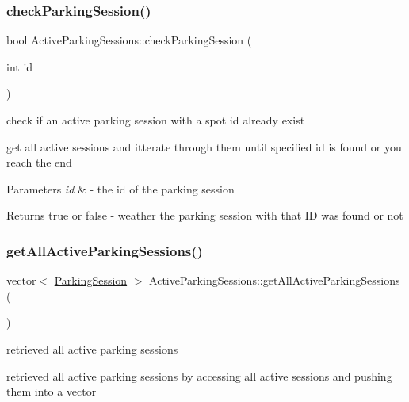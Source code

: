 \subsubsection{\texorpdfstring{check\+Parking\+Session()}{checkParkingSession()}}
{\footnotesize\ttfamily bool Active\+Parking\+Sessions\+::check\+Parking\+Session (\begin{DoxyParamCaption}\item[{int}]{id }\end{DoxyParamCaption})\hspace{0.3cm}{\ttfamily [private]}}



check if an active parking session with a spot id already exist 

get all active sessions and itterate through them until specified id is found or you reach the end


\begin{DoxyParams}{Parameters}
{\em id} & -\/ the id of the parking session \\
\hline
\end{DoxyParams}
\begin{DoxyReturn}{Returns}
true or false -\/ weather the parking session with that ID was found or not 
\end{DoxyReturn}
\mbox{\label{class_active_parking_sessions_a70eefb3fa7f69bfb69daf95e2284c7dd}} 
\subsubsection{\texorpdfstring{get\+All\+Active\+Parking\+Sessions()}{getAllActiveParkingSessions()}}
{\footnotesize\ttfamily vector$<$ \mbox{\hyperlink{class_parking_session}{Parking\+Session}} $>$ Active\+Parking\+Sessions\+::get\+All\+Active\+Parking\+Sessions (\begin{DoxyParamCaption}{ }\end{DoxyParamCaption})}



retrieved all active parking sessions 

retrieved all active parking sessions by accessing all active sessions and pushing them into a vector


